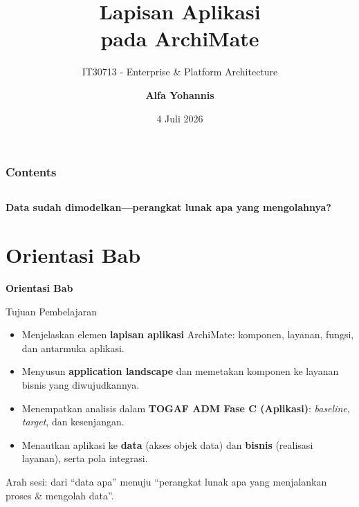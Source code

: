 \documentclass[aspectratio=169, table]{beamer}
\title{\huge Lapisan Aplikasi\\
  \vspace{8pt}
  pada ArchiMate}
\subtitle{IT30713 - Enterprise \& Platform Architecture}
\author{\textbf{Alfa Yohannis}}
\date{4 Juli 2026}
\newcommand{\sectionframe}[1]{%
  \begin{frame}{\hfill}
    \centering
    \Huge{\textbf{#1}}
  \end{frame}
}
\newcommand{\takeaway}[1]{%
  \vspace{4pt}
  {\footnotesize #1}
}
\begin{document}
\frame{\titlepage}

\begin{frame}[fragile]
  \frametitle{Contents}
  \vspace{20pt}
  \begin{columns}[t]
    \tableofcontents[sections={1-4}]

    \tableofcontents[sections={5-8}]
  \end{columns}
\end{frame}

\begin{frame}{\hfill}
  \centering
  \Huge{\textbf{Data sudah dimodelkan---perangkat lunak apa yang mengolahnya?}}
\end{frame}

\section{Orientasi Bab}
\sectionframe{Orientasi Bab}

\begin{frame}{Tujuan Pembelajaran}
  \vspace{6pt}
  \begin{itemize}
    \item Menjelaskan elemen \textbf{lapisan aplikasi} ArchiMate: komponen,
          layanan, fungsi, dan antarmuka aplikasi.
    \item Menyusun \textbf{application landscape} dan memetakan komponen ke
          layanan bisnis yang diwujudkannya.
    \item Menempatkan analisis dalam \textbf{TOGAF ADM Fase C (Aplikasi)}:
          \emph{baseline}, \emph{target}, dan kesenjangan.
    \item Menautkan aplikasi ke \textbf{data} (akses objek data) dan
          \textbf{bisnis} (realisasi layanan), serta pola integrasi.
  \end{itemize}
  \takeaway{Arah sesi: dari ``data apa'' menuju ``perangkat lunak apa yang
  menjalankan proses \& mengolah data''.}
\end{frame}
\end{document}
